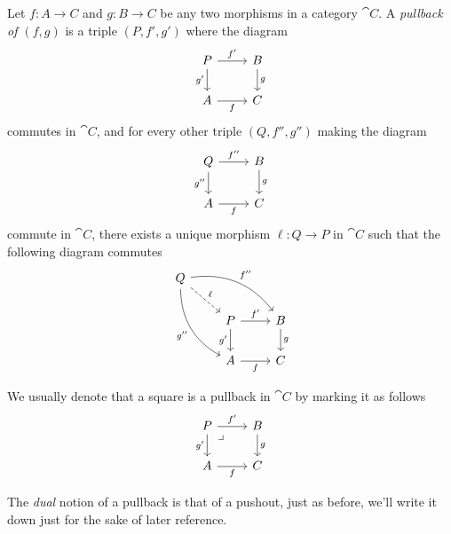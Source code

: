 \begin{definition}[Pullback]
    \label{def:pullback}
    Let \(f: A \to C\) and \(g: B \to C\) be any two morphisms in a category
    \(\cat C\). A \emph{pullback of \((f, g)\)} is a triple \((P, f', g')\)
    where the diagram
    \[
        \begin{tikzcd}
            P \ar[r, "f'"] \ar[d, "g'"'] &B \ar[d, "g"]
            \\
            A \ar[r, "f"'] &C
        \end{tikzcd}
    \]
    commutes in \(\cat C\), and for every other triple \((Q, f'', g'')\) making the
    diagram
    \[
        \begin{tikzcd}
            Q \ar[r, "f''"] \ar[d, "g''"'] &B \ar[d, "g"]
            \\
            A \ar[r, "f"'] &C
        \end{tikzcd}
    \]
    commute in \(\cat C\), there exists a unique morphism \(\ell: Q \to P\) in
    \(\cat C\) such that the following diagram commutes
    \[
        \begin{tikzcd}
            Q \ar[dr, dashed, "\ell"]
            \ar[rrd, bend left, "f''"]
            \ar[drd, bend right, "g''"']
            & &
            \\
            &P \ar[r, "f'"] \ar[d, "g'"'] &B \ar[d, "g"]
            \\
            &A \ar[r, "f"'] &C
        \end{tikzcd}
    \]
\end{definition}

We usually denote that a square is a pullback in \(\cat C\) by marking it as
follows
\[
    \begin{tikzcd}
        P \ar[r, "f'"] \ar[d, "g'"'] \ar[dr, phantom, "\lrcorner", very near start]
        &B \ar[d, "g"]
        \\
        A \ar[r, "f"'] &C
    \end{tikzcd}
\]

The \emph{dual} notion of a pullback is that of a pushout, just as before,
we'll write it down just for the sake of later reference.

